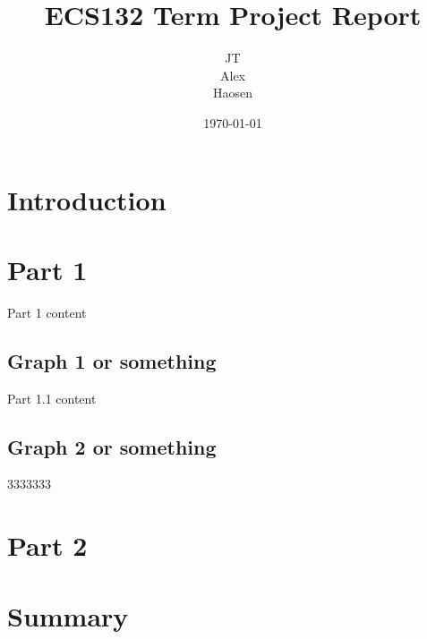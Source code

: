 \documentclass[12pt, a4paper, oneside]{report}
\title{ECS132 Term Project Report}
\author{JT\\Alex\\Haosen}
\date{\today}
\begin{document}
\maketitle
\tableofcontents
\newpage

\chapter{Introduction}

\newpage

\chapter{Part 1}
Part 1 content
\newpage

\section{Graph 1 or something}
Part 1.1 content
\newpage

\section{Graph 2 or something}
3333333
\newpage


\chapter{Part 2}
\newpage


\chapter{Summary}
\newpage
\end{document}
